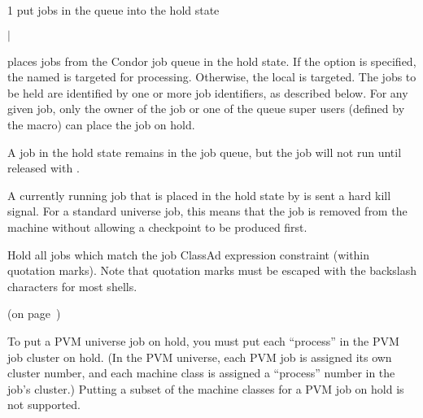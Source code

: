 \begin{ManPage}{\label{man-condor-hold}}{1}
{put jobs in the queue into the hold state}
\Synopsis {}
\ToolArgsBase

\ToolLocate 
\ToolJobs
$|$  \Dots 

\ToolLocate 
\ToolAll


\Description

 places jobs from the Condor job queue in
the hold state.
If the  option is specified, the named  is targeted
for processing.  
Otherwise, the local  is targeted.
The jobs to be held are identified by one or more job identifiers, as
described below.
For any given job, only the owner of the job or one of the queue super users
(defined by the  macro) can place the job on hold.

A job in the hold state remains in the job queue,
but the job will not run until released with .

A currently running job that is placed in the hold state by 
is sent a hard kill signal.
For a standard universe job,
this means that the job is removed from the machine without
allowing a checkpoint to be produced first.

\begin{Options}

	\ToolArgsBaseDesc
	\ToolLocateDesc
         {Hold all jobs which match
	        the job ClassAd expression constraint (within quotation
		marks).
		Note that quotation marks must be escaped with the
		backslash characters for most shells.  }

\end{Options}

\SeeAlso
{} (on page~\pageref{man-condor-release})

\GenRem

To put a PVM universe job on hold, you must put each ``process'' in
the PVM job cluster on hold.  (In the PVM universe, each PVM job is
assigned its own cluster number, and each machine class is assigned a
``process'' number in the job's cluster.)  Putting a subset of the
machine classes for a PVM job on hold is not supported.


\end{ManPage}
